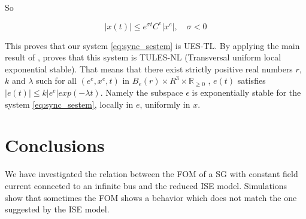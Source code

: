 \documentclass[conference]{IEEEtran}
\begin{document}
So 

\[
\left|x(t)\right|\leq e^{\sigma t}C^{e}\left|x^{e}\right|,\quad\sigma<0
\]

This proves that our system \eqref{eq:sync_sestem} is UES-TL. By applying
the main result of \cite{VincentBayuLaurent2016}, proves that this
system is TULES-NL (Transversal uniform local exponential stable).
That means that there exist strictly positive real numbers $r$, $k$
and $\lambda$ such for all $(e^{e},x^{e},t)$ in $B_{e}(r)\times R^{3}\times\mathbb{R}_{\geq0}$
, $e(t)$ satisfies $\left|e(t)\right|\leq k\left|e^{e}\right|exp(-\lambda t)$.
Namely the subspace $\epsilon$ is exponentially stable for the system
\eqref{eq:sync_sestem}, locally in $e$, uniformly in $x$.
\section{Conclusions}

We have investigated the relation between the FOM of a SG with constant
field current connected to an infinite bus and the reduced ISE model. 
Simulations show that sometimes the FOM shows a behavior which does
not match the one suggested by the ISE model. 
\end{document}
